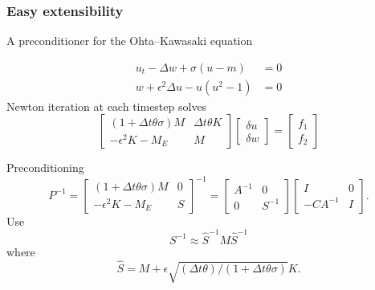 \documentclass[presentation]{beamer}
\begin{document}
\begin{frame}[allowframebreaks]
  \frametitle{Easy extensibility}
  A preconditioner for the Ohta--Kawasaki
  equation \parencite{Farrell:2016}

  \begin{equation*}
    \begin{split}
      u_t - \Delta w + \sigma(u - m) &= 0\\
      w + \epsilon^2 \Delta u - u(u^2 - 1) &= 0
    \end{split}
  \end{equation*}
  Newton iteration at each timestep solves
  \begin{equation*}
    \begin{bmatrix}
      (1 + \Delta t \theta \sigma)M  & \Delta t\theta K \\
      -\epsilon^2 K - M_E & M
    \end{bmatrix}
    \begin{bmatrix}
      \delta u \\
      \delta w
    \end{bmatrix} =
    \begin{bmatrix}
      f_1 \\
      f_2
    \end{bmatrix}
  \end{equation*}

  \pagebreak
  
  Preconditioning
  \begin{equation*}
    P^{-1} = 
    \begin{bmatrix}
      (1 + \Delta t \theta \sigma)M  & 0 \\
      -\epsilon^2 K - M_E & S
    \end{bmatrix}^{-1} =
    \begin{bmatrix}
      A^{-1}  & 0 \\
      0 & S^{-1}
    \end{bmatrix}
    \begin{bmatrix}
      I & 0 \\
      -C A^{-1}  & I
    \end{bmatrix}.
  \end{equation*}
  Use
  \begin{equation*}
    S^{-1} \approx \hat{S}^{-1}M\hat{S}^{-1}
  \end{equation*}
  where
  \begin{equation*}
    \hat{S} = M + \epsilon\sqrt{(\Delta t \theta)/(1+\Delta t \theta\sigma)} K.
  \end{equation*}
\end{frame}
\end{document}
